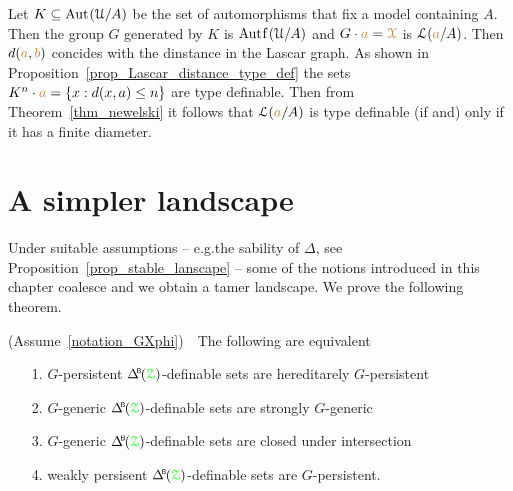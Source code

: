 

\begin{example}\label{ex_newelski}
  Let $K\subseteq{\rm Aut\kern.15ex}(\EuScript U/A)$ be the set of automorphisms that fix a model containing $A$.
  Then the group $G$  generated by $K$ is $\mathord{\rm Aut\kern.15ex{f}\kern.15ex}(\EuScript U/A)$ and $G\cdot{\color{brown}a}={\color{brown}\EuScript X}$ is $\EuScript L({\color{brown} a}/A)$.
  Then $d({\color{brown} a},{\color{brown} b})$ concides with the dinstance in the Lascar graph.
  As shown in Proposition~\ref{prop_Lascar_distance_type_def} the sets $K^n\cdot{\color{brown}a}=\{x:d(x,a)\le n\}$ are type definable.
  Then from Theorem~\ref{thm_newelski} it follows that $\EuScript L({\color{brown} a}/A)$ is type definable (if and) only if it has a finite diameter.
\end{example} 

\section{A simpler landscape}

Under suitable assumptions -- e.g.\@ the sability of $\Delta$, see Proposition~\ref{prop_stable_lanscape} -- some of the notions introduced in this chapter coalesce and we obtain a tamer landscape.
We prove the following theorem.

\begin{theorem}\label{thm_coalesce}
  (Assume~\ref{notation_GXphi})\ \ 
  The following are equivalent
  \begin{itemize}
    \item[1.] $G$-persistent $\BDelta({\grZ})$-definable sets are hereditarely $G$-persistent
    \item[2.] $G$-generic $\BDelta({\grZ})$-definable sets are strongly $G$-generic
    \item[3.] $G$-generic $\BDelta({\grZ})$-definable sets are closed under intersection
    \item[4.] weakly persisent $\BDelta({\grZ})$-definable sets are $G$-persistent.
  \end{itemize}
\end{theorem}

